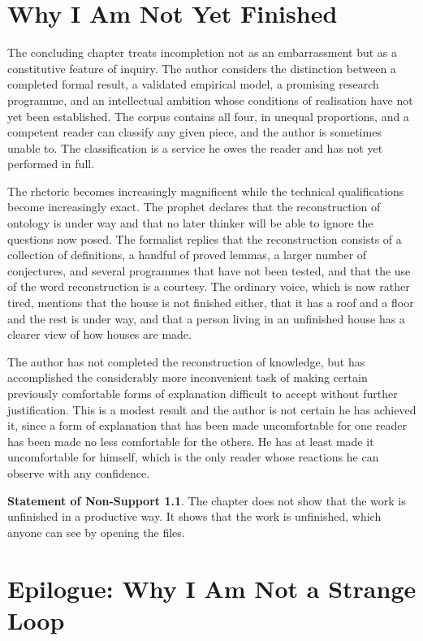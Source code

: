 \documentclass[11pt,openany,twoside]{book}
\theoremstyle{plain}
\theoremstyle{definition}
\newtheorem{nonsupport}{Statement of Non-Support}
\theoremstyle{remark}
\begin{document}
\chapter{Why I Am Not Yet Finished}

The concluding chapter treats incompletion not as an embarrassment but as a constitutive feature of inquiry. The author considers the distinction between a completed formal result, a validated empirical model, a promising research programme, and an intellectual ambition whose conditions of realisation have not yet been established. The corpus contains all four, in unequal proportions, and a competent reader can classify any given piece, and the author is sometimes unable to. The classification is a service he owes the reader and has not yet performed in full.

The rhetoric becomes increasingly magnificent while the technical qualifications become increasingly exact. The prophet declares that the reconstruction of ontology is under way and that no later thinker will be able to ignore the questions now posed. The formalist replies that the reconstruction consists of a collection of definitions, a handful of proved lemmas, a larger number of conjectures, and several programmes that have not been tested, and that the use of the word reconstruction is a courtesy. The ordinary voice, which is now rather tired, mentions that the house is not finished either, that it has a roof and a floor and the rest is under way, and that a person living in an unfinished house has a clearer view of how houses are made.

The author has not completed the reconstruction of knowledge, but has accomplished the considerably more inconvenient task of making certain previously comfortable forms of explanation difficult to accept without further justification. This is a modest result and the author is not certain he has achieved it, since a form of explanation that has been made uncomfortable for one reader has been made no less comfortable for the others. He has at least made it uncomfortable for himself, which is the only reader whose reactions he can observe with any confidence.

\begin{nonsupport}
The chapter does not show that the work is unfinished in a productive way. It shows that the work is unfinished, which anyone can see by opening the files.
\end{nonsupport}

\chapter*{Epilogue: Why I Am Not a Strange Loop}
\end{document}
